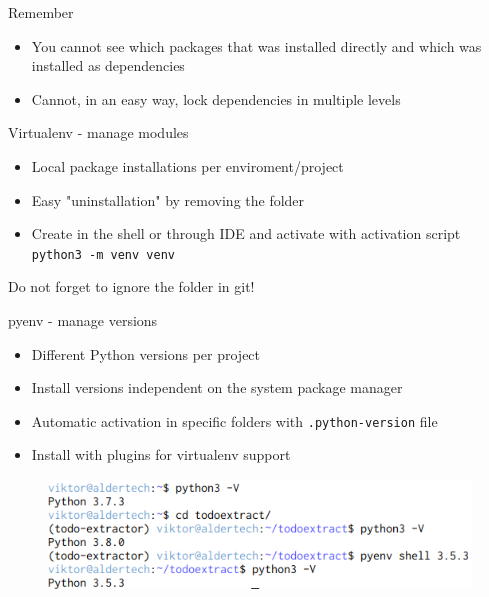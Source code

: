 \begin{frame}{Remember}
  \begin{itemize}
    \item You cannot see which packages that was installed directly and which was installed as dependencies
    \item Cannot, in an easy way, lock dependencies in multiple levels
  \end{itemize}
\end{frame}

\begin{frame}{Virtualenv - manage modules}
  \begin{itemize}
    \item Local package installations per enviroment/project
    \item Easy "uninstallation" by removing the folder
    \item Create in the shell or through IDE and activate with activation script
          \texttt{python3 -m venv venv}\\
  \end{itemize}

  Do not forget to ignore the folder in git!
\end{frame}

\begin{frame}{pyenv - manage versions}
  \begin{itemize}
    \item Different Python versions per project
    \item Install versions independent on the system package manager
    \item Automatic activation in specific folders with \texttt{.python-version} file
    \item Install with plugins for virtualenv support
  \end{itemize}

  \vfill

  \begin{figure}
    \includegraphics[width=0.8\linewidth,keepaspectratio]{fig/pyenv}
  \end{figure}
\end{frame}

